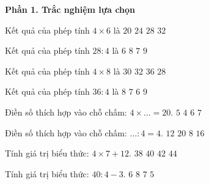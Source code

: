 \textbf{Phần 1. Trắc nghiệm lựa chọn}

\begin{ex} %
Kết quả của phép tính $4 \times 6$ là
\choice
{$20$}
{\True $24$}
{$28$}
{$32$}
\end{ex}

\begin{ex} %
Kết quả của phép tính $28 : 4$ là
\choice
{$6$}
{$8$}
{\True $7$}
{$9$}
\end{ex}

\begin{ex} %
Kết quả của phép tính $4 \times 8$ là
\choice
{$30$}
{\True $32$}
{$36$}
{$28$}
\end{ex}

\begin{ex} %
Kết quả của phép tính $36 : 4$ là
\choice
{$8$}
{$7$}
{$6$}
{\True $9$}
\end{ex}

\begin{ex} %
Điền số thích hợp vào chỗ chấm: $4 \times \dots = 20$.
\choice
{\True $5$}
{$4$}
{$6$}
{$7$}
\end{ex}

\begin{ex} %
Điền số thích hợp vào chỗ chấm: $\dots : 4 = 4$.
\choice
{$12$}
{$20$}
{$8$}
{\True $16$}
\end{ex}

\begin{ex} %
Tính giá trị biểu thức: $4 \times 7 + 12$.
\choice
{$38$}
{\True $40$}
{$42$}
{$44$}
\end{ex}

\begin{ex} %
Tính giá trị biểu thức: $40 : 4 - 3$.
\choice
{$6$}
{$8$}
{\True $7$}
{$5$}
\end{ex}

